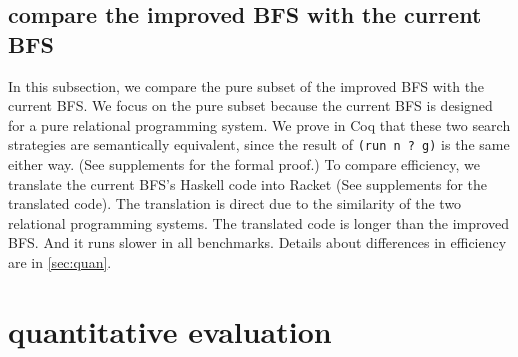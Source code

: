 \documentclass[format=acmlarge, review=true, authordraft=true]{acmart}
\newcommand{\BFSser}[0]{the current BFS}
\newcommand{\BFSimp}[0]{the improved BFS}
\begin{document}
\subsection{compare \BFSimp{} with \BFSser{}}

In this subsection, we compare the pure subset of \BFSimp{} with \BFSser{}. We 
focus on the pure subset because \BFSser{} is designed for a pure 
relational programming system. We prove in Coq that these two search strategies 
are semantically equivalent, since the result of \texttt{(run n ? g)} is 
the same either way. (See supplements for the formal proof.) To 
compare efficiency, we translate \BFSser{}'s Haskell code into Racket (See 
supplements for the translated code). The translation is direct due to the 
similarity of the two relational programming systems. The translated code is 
longer than \BFSimp{}. And it runs slower in all benchmarks. Details about 
differences in efficiency are in \autoref{sec:quan}.

\section{quantitative evaluation}
\label{sec:quan}
\end{document}
